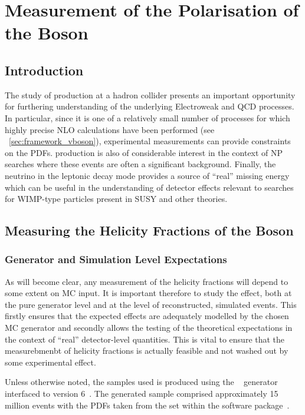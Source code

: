 \chapter{Measurement of the Polarisation of the \texorpdfstring{\PW}{W} Boson}
\label{sec:wpol}
\section{Introduction}
The study of \Wjets production at a hadron collider presents an important
opportunity for furthering understanding of the underlying Electroweak and
\ac{QCD} processes. In particular, since it is one of a relatively small number
of processes for which highly precise \ac{NLO} calculations have been performed
(see \sec~\ref{sec:framework_vboson}), experimental measurements can provide
constraints on the \acp{PDF}. \Wjets production is also of considerable interest
in the context of \ac{NP} searches where these events are often a significant
background. Finally, the neutrino in the leptonic decay mode provides a source
of ``real'' missing energy which can be useful in the understanding of detector
effects relevant to searches for \acs{WIMP}-type particles present in \ac{SUSY}
and other theories.

\section{Measuring the Helicity Fractions of the \texorpdfstring{\PW}{W} Boson}
\subsection{Generator and Simulation Level Expectations}
As will become clear, any measurement of the helicity fractions will depend to
some extent on \acl{MC} input. It is important therefore to study the effect,
both at the pure generator level and at the level of reconstructed, simulated
events. This firstly ensures that the expected effects are adequately modelled
by the chosen \ac{MC} generator and secondly allows the testing of the
theoretical expectations in the context of ``real'' detector-level
quantities. This is vital to ensure that the measurebmenbt of helicity fractions
is actually feasible and not washed out by some experimental effect.

Unless otherwise noted, the \Wjets samples used is produced using the
\madgraph~\cite{madgraph} generator interfaced to \pythia version
6~\cite{pythia}. The generated sample comprised approximately 15 million events
with the \acp{PDF} taken from the \cteqsixlone set within the \lhapdf software
package~\cite{lhapdf, lhapdf_web}.

